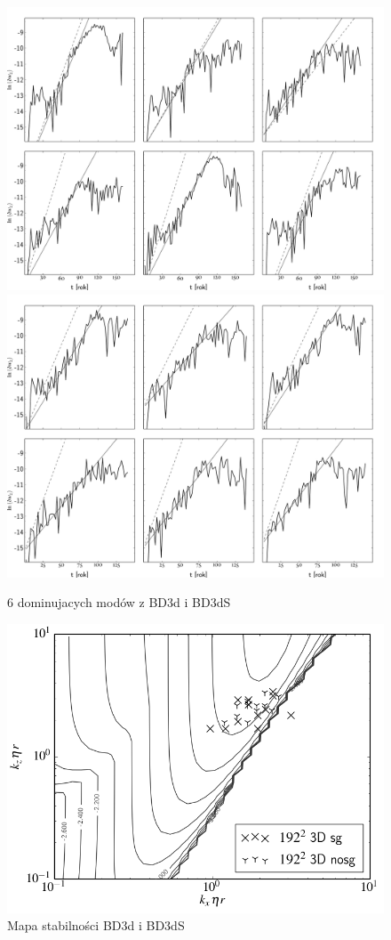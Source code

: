 \begin{figure}
   \centering
   \includegraphics[width=0.95\linewidth]{figures/nosg_vlzd_growth}
   \includegraphics[width=0.95\linewidth]{figures/sg_vlzd_growth}
   \caption{6 dominujacych modów z BD3d i BD3dS}
   \label{fig:modes3d}
\end{figure}
%   
\begin{figure}
   \centering
   \includegraphics[width=0.5\linewidth]{figures/3d_map_x3_50.png}
   \caption{Mapa stabilności BD3d i BD3dS}
   \label{fig:modes3d}
\end{figure}
